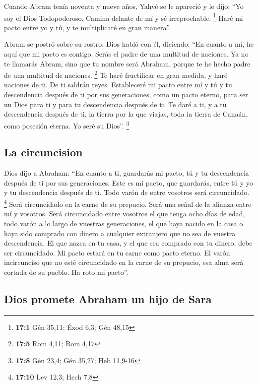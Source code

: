  Cuando Abram tenía noventa y nueve años, Yahvé se le
apareció y le dijo: ``Yo soy el Dios Todopoderoso. Camina delante de mí
y sé irreprochable. \footnote{\textbf{17:1} Gén 35,11; Éxod 6,3; Gén
  48,15}  Haré mi pacto entre yo y tú, y te multiplicaré
en gran manera''.

 Abram se postró sobre su rostro. Dios habló con él,
diciendo:  ``En cuanto a mí, he aquí que mi pacto es
contigo. Serás el padre de una multitud de naciones.  Ya
no te llamarás Abram, sino que tu nombre será Abraham, porque te he
hecho padre de una multitud de naciones. \footnote{\textbf{17:5} Rom
  4,11; Rom 4,17}  Te haré fructificar en gran medida, y
haré naciones de ti. De ti saldrán reyes.  Estableceré mi
pacto entre mí y tú y tu descendencia después de ti por sus
generaciones, como un pacto eterno, para ser un Dios para ti y para tu
descendencia después de ti.  Te daré a ti, y a tu
descendencia después de ti, la tierra por la que viajas, toda la tierra
de Canaán, como posesión eterna. Yo seré su Dios''. \footnote{\textbf{17:8}
  Gén 23,4; Gén 35,27; Heb 11,9-16}

\hypertarget{la-circuncision}{%
\subsection{La circuncision}\label{la-circuncision}}

 Dios dijo a Abraham: ``En cuanto a ti, guardarás mi
pacto, tú y tu descendencia después de ti por sus generaciones.
 Este es mi pacto, que guardarás, entre tú y yo y tu
descendencia después de ti. Todo varón de entre vosotros será
circuncidado. \footnote{\textbf{17:10} Lev 12,3; Hech 7,8}
 Será circuncidado en la carne de su prepucio. Será una
señal de la alianza entre mí y vosotros.  Será
circuncidado entre vosotros el que tenga ocho días de edad, todo varón a
lo largo de vuestras generaciones, el que haya nacido en la casa o haya
sido comprado con dinero a cualquier extranjero que no sea de vuestra
descendencia.  El que nazca en tu casa, y el que sea
comprado con tu dinero, debe ser circuncidado. Mi pacto estará en tu
carne como pacto eterno.  El varón incircunciso que no
esté circuncidado en la carne de su prepucio, esa alma será cortada de
su pueblo. Ha roto mi pacto''.

\hypertarget{dios-promete-abraham-un-hijo-de-sara}{%
\subsection{Dios promete Abraham un hijo de
Sara}\label{dios-promete-abraham-un-hijo-de-sara}}

